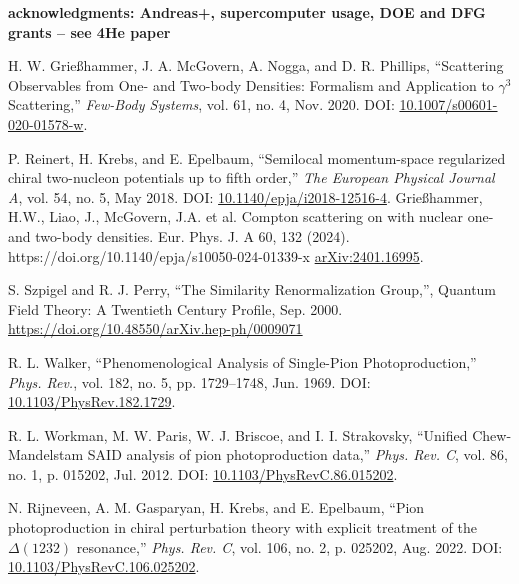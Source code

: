 \documentclass[a4paper,11pt]{article}
\newcommand{\com}[1]{\color{blue}\small\textbf{ #1 }\color{black}\normalsize}
\begin{document}
\com{acknowledgments: Andreas+, supercomputer usage, DOE and DFG grants -- see 4He paper}
\begin{thebibliography}{99}
  H. W. Grie{\ss}hammer, J. A. McGovern, A. Nogga, and D. R.
  Phillips, ``Scattering Observables from One- and Two-body
  Densities: Formalism and Application to $\gamma^3$ Scattering,''
  \textit{Few-Body Systems}, vol. 61, no. 4, Nov. 2020. DOI:
  \href{https://doi.org/10.1007/s00601-020-01578-w}{10.1007/s00601-020-01578-w}.

  P. Reinert, H. Krebs, and E. Epelbaum, ``Semilocal momentum-space
  regularized chiral two-nucleon potentials up to fifth order,''
  \textit{The European Physical Journal A}, vol. 54, no. 5, May 2018.
  DOI:
  \href{http://dx.doi.org/10.1140/epja/i2018-12516-4}{10.1140/epja/i2018-12516-4}.
Grießhammer, H.W., Liao, J., McGovern, J.A. et al. Compton scattering on 
 with nuclear one- and two-body densities. Eur. Phys. J. A 60, 132 (2024). https://doi.org/10.1140/epja/s10050-024-01339-x
\href{https://arxiv.org/abs/2401.16995}{arXiv:2401.16995}.

S. Szpigel and R. J. Perry, ``The Similarity Renormalization Group,'', Quantum Field Theory: A Twentieth Century Profile,
Sep. 2000. \href{https://doi.org/10.48550/arXiv.hep-ph/0009071}{https://doi.org/10.48550/arXiv.hep-ph/0009071}

R. L. Walker, ``Phenomenological Analysis of Single-Pion
Photoproduction,'' \textit{Phys. Rev.}, vol. 182, no. 5, pp.
1729--1748, Jun. 1969. DOI:
\href{https://link.aps.org/doi/10.1103/PhysRev.182.1729}{10.1103/PhysRev.182.1729}.

R. L. Workman, M. W. Paris, W. J. Briscoe, and I. I. Strakovsky,
``Unified Chew-Mandelstam SAID analysis of pion photoproduction
data,'' \textit{Phys. Rev. C}, vol. 86, no. 1, p. 015202, Jul.
2012. DOI:
\href{https://link.aps.org/doi/10.1103/PhysRevC.86.015202}{10.1103/PhysRevC.86.015202}.

N. Rijneveen, A. M. Gasparyan, H. Krebs, and E. Epelbaum, ``Pion photoproduction in chiral perturbation theory with explicit treatment of the $\Delta(1232)$ resonance,'' \textit{Phys. Rev. C}, vol. 106, no. 2, p. 025202, Aug. 2022. DOI: \href{https://link.aps.org/doi/10.1103/PhysRevC.106.025202}{10.1103/PhysRevC.106.025202}.


\end{thebibliography}
\end{document}
